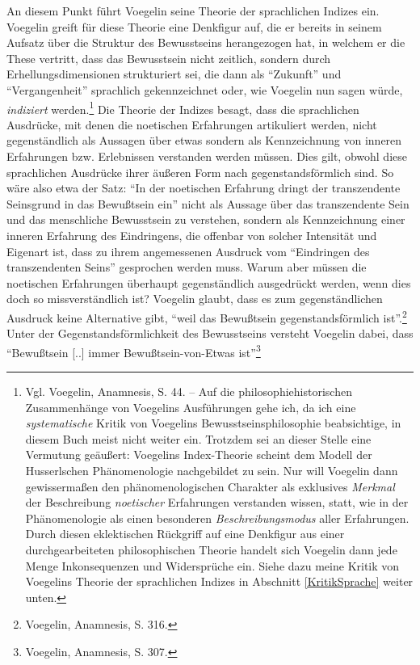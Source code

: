 An diesem Punkt führt Voegelin seine Theorie der sprachlichen Indizes ein.
Voegelin greift für diese Theorie eine Denkfigur auf, die er bereits in seinem
Aufsatz über die Struktur des Bewusstseins herangezogen hat, in welchem er die
These vertritt, dass das Bewusstsein nicht zeitlich, sondern durch
Erhellungsdimensionen strukturiert sei, die dann als "`Zukunft"' und
"`Vergangenheit"' sprachlich gekennzeichnet oder, wie Voegelin nun sagen
würde, {\it indiziert} werden.\footnote{Vgl. Voegelin, Anamnesis, S. 44. --
  Auf die philosophiehistorischen Zusammenhänge von Voegelins Ausführungen
  gehe ich, da ich eine {\em systematische} Kritik von Voegelins
  Bewusstseinsphilosophie beabsichtige, in diesem Buch meist nicht weiter ein.
  Trotzdem sei an dieser Stelle eine Vermutung geäußert: Voegelins
  Index-Theorie scheint dem Modell der Husserlschen Phänomenologie
  nachgebildet zu sein. Nur will Voegelin dann gewissermaßen den
  phänomenologischen Charakter als exklusives {\em Merkmal} der Beschreibung
  {\em noetischer} Erfahrungen verstanden wissen, statt, wie in der
  Phänomenologie als einen besonderen {\em Beschreibungsmodus} aller
  Erfahrungen. Durch diesen eklektischen Rückgriff auf eine Denkfigur aus
  einer durchgearbeiteten philosophischen Theorie handelt sich Voegelin dann
  jede Menge Inkonsequenzen und Widersprüche ein. Siehe dazu meine Kritik von
  Voegelins Theorie der sprachlichen Indizes in Abschnitt \ref{KritikSprache}
  weiter unten.} Die Theorie der Indizes besagt, dass die sprachlichen
Ausdrücke, mit denen die noetischen Erfahrungen artikuliert werden, nicht
gegenständlich als Aussagen über etwas sondern als Kennzeichnung von inneren
Erfahrungen bzw.  Erlebnissen verstanden werden müssen. Dies gilt, obwohl
diese sprachlichen Ausdrücke ihrer äußeren Form nach gegenstandsförmlich sind.
So wäre also etwa der Satz: "`In der noetischen Erfahrung dringt der
transzendente Seinsgrund in das Bewußtsein ein"' nicht als Aussage über das
transzendente Sein und das menschliche Bewusstsein zu verstehen, sondern als
Kennzeichnung einer inneren Erfahrung des Eindringens, die offenbar von
solcher Intensität und Eigenart ist, dass zu ihrem angemessenen Ausdruck vom
"`Eindringen des transzendenten Seins"' gesprochen werden muss. Warum aber
müssen die noetischen Erfahrungen überhaupt gegenständlich ausgedrückt werden,
wenn dies doch so missverständlich ist?  Voegelin glaubt, dass es zum
gegenständlichen Ausdruck keine Alternative gibt, "`weil das Bewußtsein
gegenstandsförmlich ist"'.\footnote{Voegelin, Anamnesis, S. 316.} Unter der
Gegenstandsförmlichkeit des Bewusstseins versteht Voegelin dabei, dass
"`Bewußtsein [..] immer Bewußtsein-von-Etwas ist"'\footnote{Voegelin,
  Anamnesis, S. 307.}

